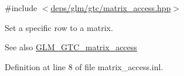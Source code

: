 {\ttfamily \#include $<$\hyperlink{matrix__access_8hpp}{deps/glm/gtc/matrix\+\_\+access.\+hpp}$>$}

Set a specific row to a matrix. \begin{DoxySeeAlso}{See also}
\hyperlink{group__gtc__matrix__access}{G\+L\+M\+\_\+\+G\+T\+C\+\_\+matrix\+\_\+access} 
\end{DoxySeeAlso}


Definition at line 8 of file matrix\+\_\+access.\+inl.

